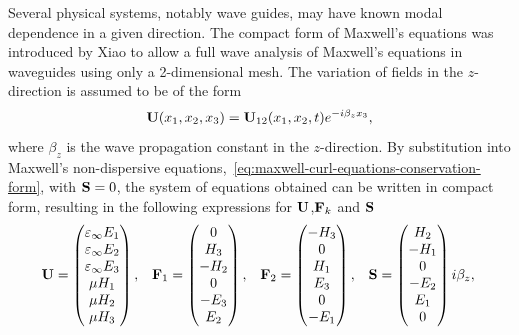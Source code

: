 Several physical systems, notably wave guides, may have known modal dependence
in a given direction. The compact form of Maxwell's equations was introduced by
Xiao\cite{Xiao:1992be} to allow a full wave analysis of Maxwell's equations in
waveguides using only a 2-dimensional mesh. The variation of fields in the
$z$-direction is assumed to be of the form
\begin{equation}
  \mathbf{U}(x_1,x_2,x_3) = \mathbf{U}_{12}(x_1, x_2,t) e^{-i \beta_z x_3},
  \label{eq:compact2D-zdep}
\end{equation}
where $\beta_z$ is the wave propagation constant in the $z$-direction. By
substitution into Maxwell's non-dispersive
equations,~\eqref{eq:maxwell-curl-equations-conservation-form}, with
$\mathbf{S} = 0$, the system of equations obtained can be written in compact
form\cite{}, resulting in the following expressions for $\mathbf{U}$,$\mathbf{F}_{k}$
and $\mathbf{S}$
\begin{equation*}
  \begin{array}{ccccc}
    \mathbf{U} = \begin{pmatrix} \varepsilon_{\infty} E_1 \\ \varepsilon_{\infty} E_2 \\ \varepsilon_{\infty} E_3 \\ \mu H_1 \\ \mu H_2 \\  \mu H_3  \end{pmatrix} ,
 &
   \mathbf{F}_1 = \begin{pmatrix} 0 \\ H_3 \\ -H_2 \\ 0 \\ -E_3 \\ E_2  \end{pmatrix} ,
 &
   \mathbf{F}_2 = \begin{pmatrix} - H_3 \\ 0 \\ H_1 \\ E_3 \\ 0 \\ -E_1 \end{pmatrix} ,
 &
   \mathbf{S} = \begin{pmatrix} H_2 \\ -H_1 \\ 0 \\ -E_2 \\ E_1 \\ 0 \end{pmatrix} i \beta_z ,
  \end{array}
  \:
\end{equation*}

